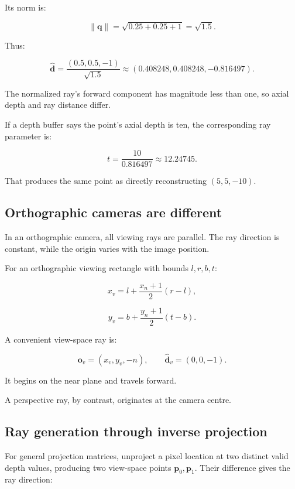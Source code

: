 Its norm is:

\[ \|\mathbf q\|= \sqrt{0.25+0.25+1} =\sqrt{1.5}. \]

Thus:

\[ \boxed{ \hat{\mathbf d} = \frac{(0.5,0.5,-1)}{\sqrt{1.5}} \approx (0.408248,0.408248,-0.816497). } \]

The normalized ray's forward component has magnitude less than one, so axial depth and ray distance differ.

If a depth buffer says the point's axial depth is ten, the corresponding ray parameter is:

\[ t=\frac{10}{0.816497}\approx12.24745. \]

That produces the same point as directly reconstructing \((5,5,-10)\).

\subsection{Orthographic cameras are different}\label{02-foundations-ii-ch035-orthographic-cameras-are-different}

\hypertarget{02-foundations-ii-ch035-orthographic-cameras-are-different}{}

In an orthographic camera, all viewing rays are parallel. The ray direction is constant, while the origin varies with the image position.

For an orthographic viewing rectangle with bounds \(l,r,b,t\):

\[ x_v=l+\frac{x_n+1}{2}(r-l), \]

\[ y_v=b+\frac{y_n+1}{2}(t-b). \]

A convenient view-space ray is:

\[ \boxed{ \mathbf o_v=(x_v,y_v,-n), \qquad \hat{\mathbf d}_v=(0,0,-1). } \]

It begins on the near plane and travels forward.

A perspective ray, by contrast, originates at the camera centre.

\subsection{Ray generation through inverse projection}\label{02-foundations-ii-ch035-ray-generation-through-inverse-projection}

\hypertarget{02-foundations-ii-ch035-ray-generation-through-inverse-projection}{}

For general projection matrices, unproject a pixel location at two distinct valid depth values, producing two view-space points \(\mathbf p_0,\mathbf p_1\). Their difference gives the ray direction:


